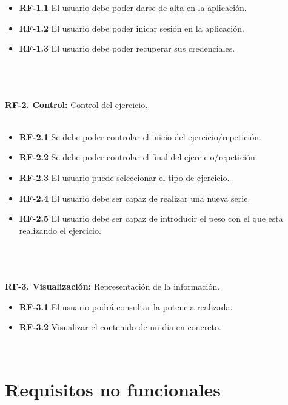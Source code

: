 \begin{itemize}

\item \textbf{RF-1.1} El usuario debe poder darse de alta en la aplicación.
\item \textbf{RF-1.2} El usuario debe poder inicar sesión en la aplicación.
\item \textbf{RF-1.3} El usuario debe poder recuperar sus credenciales.
\end{itemize}
\\
\\\\
\textbf{RF-2. Control:} Control del ejercicio.
\\
\\
\begin{itemize}
\item \textbf{RF-2.1} Se debe poder controlar el inicio del ejercicio/repetición.
\item \textbf{RF-2.2} Se debe poder controlar el final del ejercicio/repetición.
\item \textbf{RF-2.3} El usuario puede seleccionar el tipo de ejercicio.
\item \textbf{RF-2.4} El usuario debe ser capaz de realizar una nueva serie.
\item \textbf{RF-2.5} El usuario debe ser capaz de introducir el peso con el que esta realizando el ejercicio.
\end{itemize}
\\\\
\\
\textbf{RF-3. Visualización:} Representación de la información.
\\
\begin{itemize}
\item \textbf{RF-3.1} El usuario podrá consultar la potencia realizada.
\item \textbf{RF-3.2} Visualizar el contenido de un dia en concreto.
\end{itemize}
\\

\section{Requisitos no funcionales}

